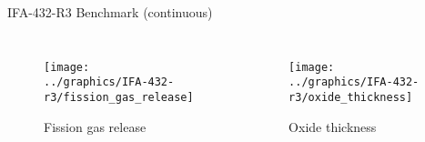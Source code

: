 \begin{frame}{IFA-432-R3 Benchmark (continuous)}
  \footnotesize 
  
  \begin{columns}[t]


  \begin{figure}[h]
    \texttt{[image: ../graphics/IFA-432-r3/fission\_gas\_release]}
    \caption{Fission gas release}
  \end{figure}  


  \begin{figure}[h]
    \texttt{[image: ../graphics/IFA-432-r3/oxide\_thickness]}    
    \caption{Oxide thickness}
  \end{figure}  
  
  \end{columns}

\end{frame}
